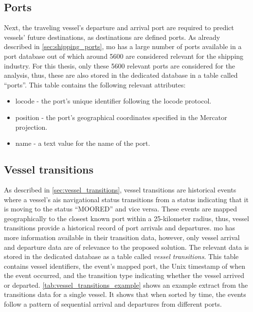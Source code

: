 \subsection{Ports}

Next, the traveling vessel's departure and arrival port are required to predict vessels' future destinations, as destinations are defined ports. As already described in \cref{sec:shipping_ports}, \acrshort{mo} has a large number of ports available in a port database out of which around 5600 are considered relevant for the shipping industry. For this thesis, only these 5600 relevant ports are considered for the analysis, thus, these are also stored in the dedicated database in a table called ``ports''. This table contains the following relevant attributes:

\begin{itemize}
    \item locode - the port's unique identifier following the \gls{locode} protocol.
    \item position - the port's geographical coordinates specified in the Mercator projection.
    \item name - a text value for the name of the port.
\end{itemize}

\subsection{Vessel transitions}

As described in \cref{sec:vessel_transitions}, vessel transitions are historical events where a vessel's \acrshort{ais} navigational status transitions from a status indicating that it is moving to the status ``MOORED'' and vice versa. These events are mapped geographically to the closest known port within a 25-kilometer radius, thus, vessel transitions provide a historical record of port arrivals and departures. \acrshort{mo} has more information available in their transition data, however, only vessel arrival and departure data are of relevance to the proposed solution. The relevant data is stored in the dedicated database as a table called \textit{vessel transitions}. This table contains vessel identifiers, the event's mapped port, the Unix timestamp of when the event occurred, and the transition type indicating whether the vessel arrived or departed. \cref{tab:vessel_transitions_example} shows an example extract from the transitions data for a single vessel. It shows that when sorted by time, the events follow a pattern of sequential arrival and departures from different ports.

